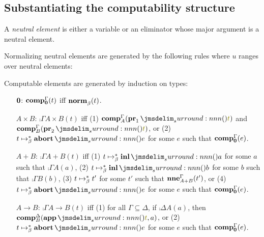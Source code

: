 \documentclass[a4paper]{article}
\begin{document}
\subsection{Substantiating the computability structure}
\label{sec:0008}

\begin{definition}
  A \emph{neutral element} is either a variable or an eliminator whose major argument is a neutral element.
\end{definition}

\begin{construction}
  Normalizing neutral elements are generated by the following rules where $u$ ranges over neutral elements:
\end{construction}

\begin{construction}
  Computable elements are generated by induction on types:
  \begin{itemize}
  \item[$\mathbf{0}$:] $\operatorname{\mathbf{comp}}^{\Gamma}_{\mathbf{0}}(t)$ iff $\operatorname{\mathbf{norm}}^{}_{\beta}(t)$.
  \item[$A \times B$:] $\comp{\Gamma}{A \times B}(t)$ iff (1) $\comp{\Gamma}{A}(\tmPrl{t})$ and $\comp{\Gamma}{B}(\tmPrr{t})$, or (2) $t \bRed* \tmAbort{e}$ for some $e$ such that $\operatorname{\mathbf{comp}}^{\Gamma}_{\mathbf{0}}(e)$.
  \item[$A + B$:] $\comp{\Gamma}{A + B}(t)$ iff (1) $t \bRed* \tmInl{a}$ for some $a$ such that $\comp{\Gamma}{A}(a)$, (2) $t \bRed* \tmInl{b}$ for some $b$ such that $\comp{\Gamma}{B}(b)$, (3) $t \bRed* t'$ for some $t'$ such that $\operatorname{\mathbf{nne}}^{\Gamma}_{A + B}(t')$, or (4) $t \bRed* \tmAbort{e}$ for some $e$ such that $\operatorname{\mathbf{comp}}^{\Gamma}_{\mathbf{0}}(e)$.
  \item[$A \to B$:] $\comp{\Gamma}{A \to B}(t)$ iff (1) for all $\Gamma \subseteq \Delta$, if $\comp{\Delta}{A}(a)$, then $\comp{\Delta}{B}(\tmApp{t}{a})$, or (2) $t \bRed* \tmAbort{e}$ for some $e$ such that $\operatorname{\mathbf{comp}}^{\Gamma}_{\mathbf{0}}(e)$.
  \end{itemize}
\end{construction}
\end{document}
